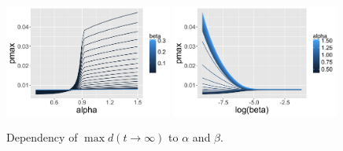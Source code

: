\begin{figure}[!h]
\centering
\includegraphics[width=0.49\textwidth]{figuresraw/pmax_alpha}
\includegraphics[width=0.49\textwidth]{figuresraw/pmax_logbeta}
\caption{Dependency of $\max d(t\rightarrow \infty )$ to $\alpha$ and $\beta$.}
\label{fig:pmax}
\end{figure}













